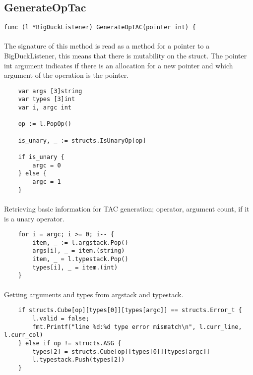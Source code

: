 \subsection{GenerateOpTac}

\begin{verbatim}
func (l *BigDuckListener) GenerateOpTAC(pointer int) {
\end{verbatim}

\paragraph{} The signature of this method is read as a method for a pointer
to a BigDuckListener, this means that there is mutability on the struct. The
pointer int argument indicates if there is an allocation for a new pointer
and which argument of the operation is the pointer.

\begin{verbatim}
    var args [3]string
    var types [3]int
    var i, argc int

    op := l.PopOp()

    is_unary, _ := structs.IsUnaryOp[op]

    if is_unary {
        argc = 0
    } else {
        argc = 1
    }
\end{verbatim}

\paragraph{} Retrieving basic information for TAC generation; operator, 
argument count, if it is a unary operator.

\begin{verbatim}
    for i = argc; i >= 0; i-- {
        item, _ := l.argstack.Pop()
        args[i], _ = item.(string)
        item, _ = l.typestack.Pop()
        types[i], _ = item.(int)
    }
\end{verbatim}

\paragraph{} Getting arguments and types from argstack and typestack.

\newpage

\begin{verbatim}
    if structs.Cube[op][types[0]][types[argc]] == structs.Error_t {
        l.valid = false;
        fmt.Printf("line %d:%d type error mismatch\n", l.curr_line, l.curr_col)
    } else if op != structs.ASG {
        types[2] = structs.Cube[op][types[0]][types[argc]]
        l.typestack.Push(types[2])
    }
\end{verbatim}

